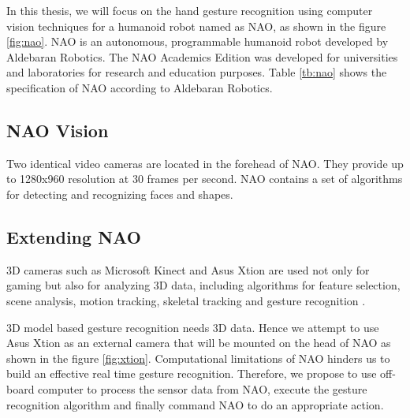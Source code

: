 In this thesis, we will focus on the hand gesture recognition using computer vision techniques for a humanoid robot named as NAO, as shown in the figure \ref{fig:nao}. NAO is an autonomous, programmable humanoid robot developed by Aldebaran Robotics. The NAO Academics Edition was developed for universities and laboratories for research and education purposes. Table \ref{tb:nao} shows the specification of NAO according to Aldebaran Robotics.

\subsection{NAO Vision} Two identical video cameras are located in the forehead of NAO. They provide up to 1280x960 resolution at 30 frames per second. NAO contains a set of algorithms for detecting and recognizing faces and shapes.

\subsection{Extending NAO} 
3D cameras such as Microsoft Kinect and Asus Xtion are used not only for gaming but also for analyzing 3D data, including algorithms for feature selection, scene analysis, motion tracking, skeletal tracking and gesture recognition \cite{12}. 

3D model based gesture recognition needs 3D data. Hence we attempt to use Asus Xtion as an external camera that will be mounted on the head of NAO as shown in the figure \ref{fig:xtion}. Computational limitations of NAO hinders us to build an effective real time gesture recognition. Therefore, we propose to use off-board computer to process the sensor data from NAO, execute the gesture recognition algorithm and finally command NAO to do an appropriate action.

